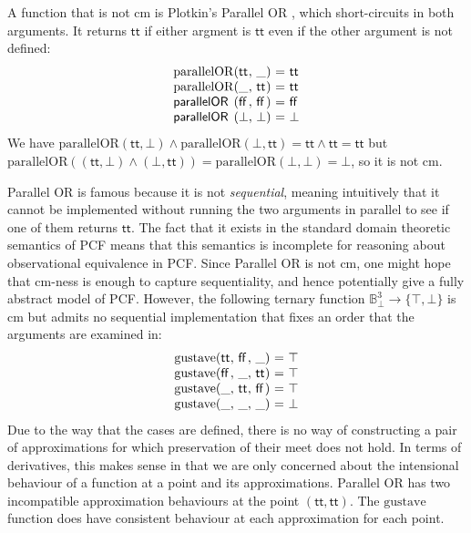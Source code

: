 \begin{example}
\end{example}

\begin{example}
  \label{ex:parallel-or}
  A function that is not cm is Plotkin's Parallel OR \cite{lcf77}, which short-circuits in both arguments. It returns $\mathsf{tt}$ if either argment is $\mathsf{tt}$ even if the other argument is not defined:
  \begin{displaymath}
    \begin{array}{l@{(}l@{,~}l@{)~}c@{~}l}
      \mathrm{parallelOR}&\mathsf{tt}&\_&=&\mathsf{tt} \\
      \mathrm{parallelOR}&\_&\mathsf{tt}&=&\mathsf{tt} \\
      \mathsf{parallelOR}&\mathsf{ff}&\mathsf{ff}&=&\mathsf{ff} \\
      \mathsf{parallelOR}&\bot&\bot&=&\bot
    \end{array}
  \end{displaymath}
  We have $\mathrm{parallelOR}(\mathsf{tt}, \bot) \wedge \mathrm{parallelOR}(\bot, \mathsf{tt}) = \mathsf{tt} \wedge \mathsf{tt} = \mathsf{tt}$ but $\mathrm{parallelOR}((\mathsf{tt},\bot) \wedge (\bot, \mathsf{tt})) = \mathrm{parallelOR}(\bot, \bot) = \bot$, so it is not cm.

  Parallel OR is famous because it is not \emph{sequential}, meaning intuitively that it cannot be implemented without running the two arguments in parallel to see if one of them returns $\mathsf{tt}$. The fact that it exists in the standard domain theoretic semantics of PCF means that this semantics is incomplete for reasoning about observational equivalence in PCF. Since Parallel OR is not cm, one might hope that cm-ness is enough to capture sequentiality, and hence potentially give a fully abstract model of PCF. However, the following ternary function $\mathbb{B}_\bot^3 \to \{\top,\bot\}$ is cm but admits no sequential implementation that fixes an order that the arguments are examined in:
  \begin{displaymath}
    \begin{array}{l@{(}l@{,~}l@{,~}l@{)~}c@{~}l}
      \mathrm{gustave}&\mathsf{tt}&\mathsf{ff}&\_&=&\top \\
      \mathrm{gustave}&\mathsf{ff}&\_&\mathsf{tt}&=&\top \\
      \mathrm{gustave}&\_&\mathsf{tt}&\mathsf{ff}&=&\top \\
      \mathrm{gustave}&\_&\_&\_&=&\bot
    \end{array}
  \end{displaymath}
  Due to the way that the cases are defined, there is no way of constructing a pair of approximations for which preservation of their meet does not hold. In terms of derivatives, this makes sense in that we are only concerned about the intensional behaviour of a function at a point and its approximations. Parallel OR has two incompatible approximation behaviours at the point $(\mathsf{tt},\mathsf{tt})$. The $\mathrm{gustave}$ function does have consistent behaviour at each approximation for each point.
\end{example}

